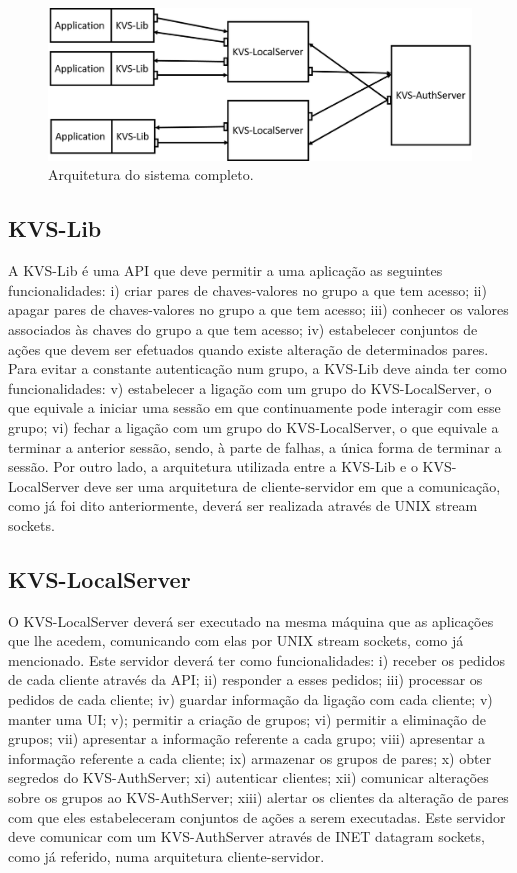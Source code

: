 \begin{figure}[ht]
    \centering
    \includegraphics[width=0.7\linewidth]{figures/architecture.png}
    \caption{Arquitetura do sistema completo.}
    \label{fig:architecture}
\end{figure}

\subsection{KVS-Lib} \label{sec:ArqLib}

A KVS-Lib é uma API que deve permitir a uma aplicação as seguintes funcionalidades: i) criar pares de chaves-valores no grupo a que tem acesso; ii) apagar pares de chaves-valores no grupo a que tem acesso; iii) conhecer os valores associados às chaves do grupo a que tem acesso; iv) estabelecer conjuntos de ações que devem ser efetuados quando existe alteração de determinados pares. Para evitar a constante autenticação num grupo, a KVS-Lib deve ainda ter como funcionalidades: v) estabelecer a ligação com um grupo do KVS-LocalServer, o que equivale a iniciar uma sessão em que continuamente pode interagir com esse grupo; vi) fechar a ligação com um grupo do KVS-LocalServer, o que equivale a terminar a anterior sessão, sendo, à parte de falhas, a única forma de terminar a sessão. Por outro lado, a arquitetura utilizada entre a KVS-Lib e o KVS-LocalServer deve ser uma arquitetura de cliente-servidor em que a comunicação, como já foi dito anteriormente, deverá ser realizada através de UNIX stream sockets.

\subsection{KVS-LocalServer}\label{sec:arq_KVSLocal}

O KVS-LocalServer deverá ser executado na mesma máquina que as aplicações que lhe acedem, comunicando com elas por UNIX stream sockets, como já mencionado. Este servidor deverá ter como funcionalidades: i) receber os pedidos de cada cliente através da API; ii) responder a esses pedidos; iii) processar os pedidos de cada cliente; iv) guardar informação da ligação com cada cliente; v) manter uma UI; v); permitir a criação de grupos; vi) permitir a eliminação de grupos; vii) apresentar a informação referente a cada grupo; viii) apresentar a informação referente a cada cliente; ix) armazenar os grupos de pares; x) obter segredos do KVS-AuthServer; xi) autenticar clientes; xii) comunicar alterações sobre os grupos ao KVS-AuthServer; xiii) alertar os clientes da alteração de pares com que eles estabeleceram conjuntos de ações a serem executadas. Este servidor deve comunicar com um KVS-AuthServer através de INET datagram sockets, como já referido, numa arquitetura cliente-servidor.

